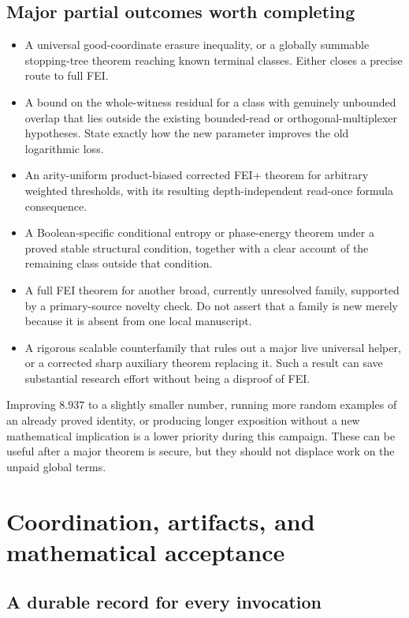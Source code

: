 \documentclass[11pt]{article}
\begin{document}
\subsection{Major partial outcomes worth completing}

\begin{itemize}
\item A universal good-coordinate erasure inequality, or a globally summable stopping-tree theorem reaching known terminal classes. Either closes a precise route to full FEI.
\item A bound on the whole-witness residual for a class with genuinely unbounded overlap that lies outside the existing bounded-read or orthogonal-multiplexer hypotheses. State exactly how the new parameter improves the old logarithmic loss.
\item An arity-uniform product-biased corrected FEI+ theorem for arbitrary weighted thresholds, with its resulting depth-independent read-once formula consequence.
\item A Boolean-specific conditional entropy or phase-energy theorem under a proved stable structural condition, together with a clear account of the remaining class outside that condition.
\item A full FEI theorem for another broad, currently unresolved family, supported by a primary-source novelty check. Do not assert that a family is new merely because it is absent from one local manuscript.
\item A rigorous scalable counterfamily that rules out a major live universal helper, or a corrected sharp auxiliary theorem replacing it. Such a result can save substantial research effort without being a disproof of FEI.
\end{itemize}

Improving $8.937$ to a slightly smaller number, running more random examples of an already proved identity, or producing longer exposition without a new mathematical implication is a lower priority during this campaign. These can be useful after a major theorem is secure, but they should not displace work on the unpaid global terms.

\section{Coordination, artifacts, and mathematical acceptance}

\subsection{A durable record for every invocation}
\end{document}
